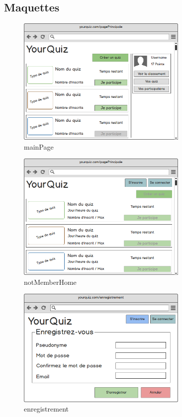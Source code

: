 \documentclass[a4paper, 12pt]{article}
\begin{document}
\subsection{Maquettes}
\begin{figure}
	\begin{center}
		\includegraphics[width=0.73\textwidth]{mockups/png/mainPage.png}
        \caption{mainPage}
	\end{center}
\end{figure}
\begin{figure}
	\begin{center}
		\includegraphics[width=0.73\textwidth]{mockups/png/notMemberHome.png}
        \caption{notMemberHome}
	\end{center}
\end{figure}
\begin{figure}
	\begin{center}
		\includegraphics[width=0.73\textwidth]{mockups/png/enregistrement.png}
        \caption{enregistrement}
	\end{center}
\end{figure}
\end{document}
